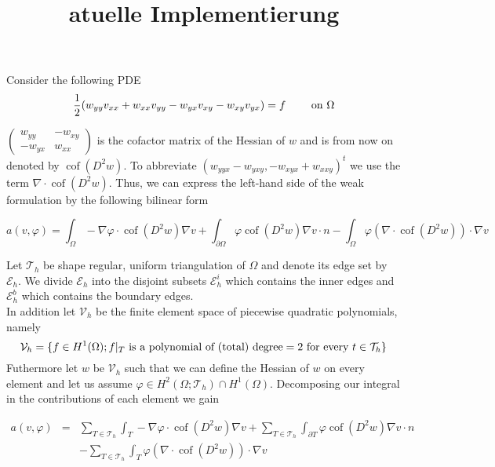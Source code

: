 \documentclass[a4paper,11pt]{article}
\title{atuelle Implementierung}
\newcommand{\myint}{\displaystyle\int}
\newcommand{\cof}{\operatorname{cof}}
\newcommand{\triang}{\mathcal{T}_h}
\begin{document}
\maketitle

Consider the following PDE 
\begin{equation}
	\frac 1 2 (w_{yy} v_{xx}+w_{xx} v_{yy} - w_{yx} v_{xy} - w_{xy} v_{yx}) = f \qquad \textnormal{ on } \Omega \label{PDE}		
\end{equation}

$\begin{pmatrix} w_{yy} & -w_{xy} \\ -w_{yx} & w_{xx} \end{pmatrix}$ is the cofactor matrix of the Hessian of $w$ and is from now on denoted by $\cof(D^2 w)$. 
To abbreviate $\left( w_{yyx}-w_{yxy}, -w_{xyx} + w_{xxy} \right)^t$ we use the term  $\nabla \cdot \cof(D^2 w)$.
Thus, we can express the left-hand side of the weak formulation by the following bilinear form

\[
	a(v,\varphi) = \myint_{\Omega} -\nabla \varphi \cdot \cof(D^2 w) \nabla v + \myint_{\partial \Omega} \varphi\cof(D^2 w) \nabla v \cdot n 
	-  \myint_\Omega \varphi (\nabla \cdot \cof(D^2 w)) \cdot \nabla v
\]

Let $\mathcal{T}_h$ be shape regular, uniform triangulation of $\Omega$ and denote its edge set by $\mathcal{E}_h$. We divide $\mathcal E _h $ into the disjoint subsets $\mathcal{E}_h^i$ which contains the inner edges and $\mathcal{E}_h^b$ which contains the boundary edges. \\
In addition let $\mathcal V_h$ be the finite element space of piecewise quadratic polynomials, namely
\[
	\mathcal V_h = \{ f \in H^1(\Omega); f \arrowvert_T \textnormal{ is a polynomial of (total) degree} = 2 \textnormal{ for every } t \in \mathcal T_h\}
\]
Futhermore let $w$ be $\mathcal V_h$ such that we can define the Hessian of $w$ on every element and let us assume $\varphi \in H^2(\Omega; \triang) \cap H^1(\Omega)$.
 Decomposing our integral in the contributions of each element we gain

\begin{eqnarray*}
a(v, \varphi) &=& \sum_{T \in \triang} \myint_T -\nabla \varphi \cdot \cof(D^2 w) \nabla v + \sum_{T \in \triang}\myint_{\partial T} \varphi \cof(D^2 w) \nabla v \cdot n \\
	&&-  \sum_{T \in \triang} \myint_T \varphi (\nabla \cdot \cof(D^2 w)) \cdot \nabla v
\end{eqnarray*}
\end{document}
